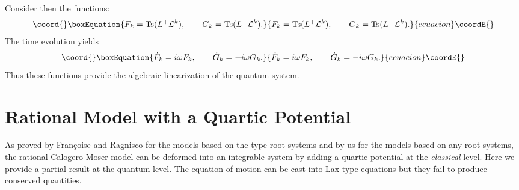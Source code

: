 \documentclass[a4paper,12pt]{article}
\begin{document}
Consider then the functions:
\begin{equation}\coord{}\boxEquation{
F_{k}=\mbox{Ts}(L^{+}{\cal L}^{k}), \qquad
G_{k}=\mbox{Ts}(L^{-}{\cal L}^{k}). \label{fgharm}
}{
F_{k}=\mbox{Ts}(L^{+}{\cal L}^{k}), \qquad
G_{k}=\mbox{Ts}(L^{-}{\cal L}^{k}). }{ecuacion}\coordE{}\end{equation}
The time evolution yields
\begin{equation}\coord{}\boxEquation{
\dot{F}_{k}=i\omega F_{k}, \qquad
\dot{G}_{k}=-i\omega G_{k}.
}{
\dot{F}_{k}=i\omega F_{k}, \qquad
\dot{G}_{k}=-i\omega G_{k}.
}{ecuacion}\coordE{}\end{equation}
Thus these functions provide the algebraic
linearization of the quantum system.

\section{Rational Model with a
Quartic Potential}
\label{quartic}
\setcounter{equation}{0}

As proved by Fran\c{c}oise and Ragnisco \cite{fr} for the models based on
the \coordHE{} type root systems  and by us \cite{cfs} for the models
based on any root systems,
the rational Calogero-Moser model can be deformed into an
integrable system by adding a quartic potential at the {\em classical}
level.
Here we provide a partial result at the quantum level.
The equation of motion can be cast into  Lax type equations but
they fail to produce  conserved quantities.
\end{document}
